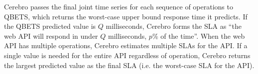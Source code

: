 Cerebro passes the final joint
time series for each sequence of operations to QBETS, 
which returns the worst-case upper bound response time it predicts.
If the QBETS predicted value is $Q$ milliseconds, 
Cerebro forms the SLA as ``the web API will respond in
under $Q$ milliseconds, $p$\% of the time''. 
When the web API has multiple operations, Cerebro estimates multiple 
SLAs for the API. 
If a single value is needed for the entire API regardless of operation,
Cerebro returns the largest 
predicted value as the final SLA (i.e. the worst-case SLA for the API).



